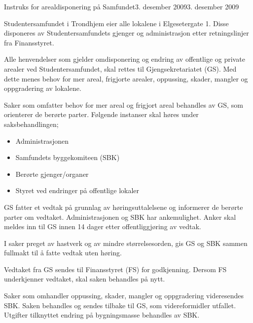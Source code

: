 \documentclass[fsbok.tex]{subfiles}
\begin{document}
\begin{instruks}{Instruks for arealdisponering på Samfundet}{3. desember 2009}{3. desember 2009}

    Studentersamfundet i Trondhjem eier alle lokalene i Elgesetergate 1. Disse disponeres
    av Studentersamfundets gjenger og administrasjon etter retningslinjer fra Finansstyret.

    Alle henvendelser som gjelder omdisponering og endring av offentlige og private
    arealer ved Studentersamfundet,
    skal rettes til Gjengsekretariatet (GS). Med dette menes behov for mer areal,
    frigjorte arealer, oppussing, skader,
    mangler og oppgradering av lokalene.

    Saker som omfatter behov for mer areal og frigjort areal behandles av GS, som
    orienterer de berørte parter. Følgende
    instanser skal høres under saksbehandlingen;

    \begin{itemize}
        \item Administrasjonen
        \item Samfundets byggekomiteen (SBK)
        \item Berørte gjenger/organer
        \item Styret ved endringer på offentlige lokaler
    \end{itemize}

    GS fatter et vedtak på grunnlag av høringsuttalelsene og informerer de berørte parter
    om vedtaket. Administrasjonen
    og SBK har ankemulighet. Anker skal meldes inn til GS innen 14 dager etter
    offentliggjøring av vedtak.

    I saker preget av hastverk og av mindre størrelsesorden, gis GS og SBK sammen fullmakt
    til å fatte vedtak uten
    høring.

    Vedtaket fra GS sendes til Finansstyret (FS) for godkjenning. Dersom FS underkjenner
    vedtaket, skal saken behandles
    på nytt.

    Saker som omhandler oppussing, skader, mangler og oppgradering videresendes SBK. Saken
    behandles og sendes
    tilbake til GS, som videreformidler utfallet. Utgifter tilknyttet endring på
    bygningsmasse behandles av SBK.

\end{instruks}
\end{document}
